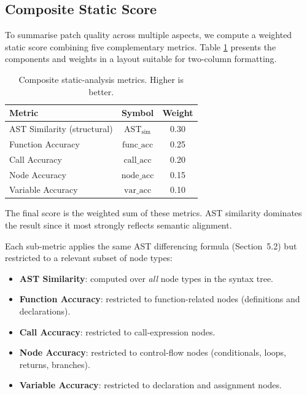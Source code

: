 
\subsection{Composite Static Score}

To summarise patch quality across multiple aspects, we compute a weighted static score combining five complementary metrics. Table \ref{tab:metrics} presents the components and weights in a layout suitable for two-column formatting.

\begin{table}[h]
\centering
\caption{Composite static-analysis metrics. Higher is better.}
\label{tab:metrics}
\begin{tabular}{lcc}
\toprule
\textbf{Metric} & \textbf{Symbol} & \textbf{Weight} \\
\midrule
AST Similarity (structural) & $\mathrm{AST}_{\text{sim}}$ & 0.30 \\
Function Accuracy            & $\mathrm{func\_acc}$        & 0.25 \\
Call Accuracy                & $\mathrm{call\_acc}$        & 0.20 \\
Node Accuracy                & $\mathrm{node\_acc}$        & 0.15 \\
Variable Accuracy            & $\mathrm{var\_acc}$         & 0.10 \\
\bottomrule
\end{tabular}
\end{table}

The final score is the weighted sum of these metrics. AST similarity dominates the result since it most strongly reflects semantic alignment.

Each sub-metric applies the same AST differencing formula (Section~5.2) but restricted to a relevant subset of node types:
\begin{itemize}
  \item \textbf{AST Similarity}: computed over \emph{all} node types in the syntax tree.
  \item \textbf{Function Accuracy}: restricted to function-related nodes (definitions and declarations).
  \item \textbf{Call Accuracy}: restricted to call-expression nodes.
  \item \textbf{Node Accuracy}: restricted to control-flow nodes (conditionals, loops, returns, branches).
  \item \textbf{Variable Accuracy}: restricted to declaration and assignment nodes.
\end{itemize}
